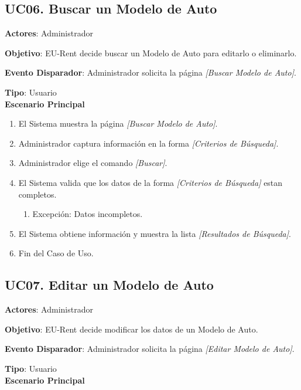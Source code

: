 \documentclass[10pt, letterpaper]{report}
\begin{document}
\subsection{UC06. Buscar un Modelo de Auto} \label{sec:cubuscarmodeloauto}
\textbf{Actores}: Administrador

\textbf{Objetivo}: EU-Rent decide buscar un Modelo de Auto para editarlo o eliminarlo.

\textbf{Evento Disparador}: Administrador solicita la página \textit{[Buscar Modelo de Auto]}.

\textbf{Tipo}: Usuario\\

\textbf{Escenario Principal}

\begin{enumerate}
\item El Sistema muestra la página \textit{[Buscar Modelo de Auto]}.
\item Administrador captura información en la forma \textit{[Criterios de Búsqueda]}.
\item Administrador elige el comando \textit{[Buscar]}.
\item El Sistema valida que los datos de la forma \textit{[Criterios de Búsqueda]} estan completos.
	\begin{enumerate}
		\item Excepción: Datos incompletos.
	\end{enumerate}
\item El Sistema obtiene información y muestra la lista \textit{[Resultados de Búsqueda]}.
\item Fin del Caso de Uso.
\end{enumerate}
\subsection{UC07. Editar un Modelo de Auto} \label{sec:cueditarmodeloauto}
\textbf{Actores}: Administrador

\textbf{Objetivo}: EU-Rent decide modificar los datos de un Modelo de Auto.

\textbf{Evento Disparador}: Administrador solicita la página \textit{[Editar Modelo de Auto]}.

\textbf{Tipo}: Usuario\\

\textbf{Escenario Principal}
\end{document}

